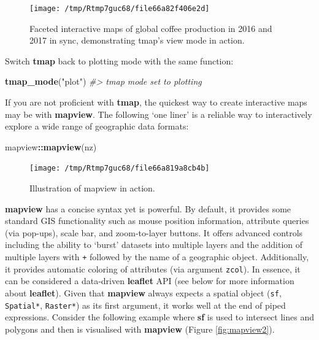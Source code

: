 \documentclass[]{krantz}
\newenvironment{Shaded}{\begin{snugshade}}{\end{snugshade}}
\newcommand{\CommentTok}[1]{\textcolor[rgb]{0.37,0.37,0.37}{\textit{#1}}}
\newcommand{\KeywordTok}[1]{\textcolor[rgb]{0.27,0.27,0.27}{\textbf{#1}}}
\newcommand{\NormalTok}[1]{#1}
\newcommand{\OperatorTok}[1]{\textcolor[rgb]{0.43,0.43,0.43}{\textbf{#1}}}
\newcommand{\StringTok}[1]{\textcolor[rgb]{0.5,0.5,0.5}{#1}}
\begin{document}
\begin{figure}[t]

{\centering \texttt{[image: /tmp/Rtmp7guc68/file66a82f406e2d]} 

}

\caption[Faceted interactive maps of global coffee production.]{Faceted interactive maps of global coffee production in 2016 and 2017 in sync, demonstrating tmap's view mode in action.}\label{fig:sync}
\end{figure}

Switch \textbf{tmap} back to plotting mode with the same function:

\begin{Shaded}
\begin{Highlighting}[]
\KeywordTok{tmap_mode}\NormalTok{(}\StringTok{"plot"}\NormalTok{)}
\CommentTok{#> tmap mode set to plotting}
\end{Highlighting}
\end{Shaded}

If you are not proficient with \textbf{tmap}, the quickest way to create interactive maps may be with \textbf{mapview}.
The following `one liner' is a reliable way to interactively explore a wide range of geographic data formats:

\begin{Shaded}
\begin{Highlighting}[]
\NormalTok{mapview}\OperatorTok{::}\KeywordTok{mapview}\NormalTok{(nz)}
\end{Highlighting}
\end{Shaded}

\begin{figure}[t]

{\centering \texttt{[image: /tmp/Rtmp7guc68/file66a819a8cb4b]} 

}

\caption{Illustration of mapview in action.}\label{fig:mapview}
\end{figure}

\textbf{mapview} has a concise syntax yet is powerful. By default, it provides some standard GIS functionality such as mouse position information, attribute queries (via pop-ups), scale bar, and zoom-to-layer buttons.
It offers advanced controls including the ability to `burst' datasets into multiple layers and the addition of multiple layers with \texttt{+} followed by the name of a geographic object.
Additionally, it provides automatic coloring of attributes (via argument \texttt{zcol}).
In essence, it can be considered a data-driven \textbf{leaflet} API (see below for more information about \textbf{leaflet}).
Given that \textbf{mapview} always expects a spatial object (\texttt{sf}, \texttt{Spatial*}, \texttt{Raster*}) as its first argument, it works well at the end of piped expressions.
Consider the following example where \textbf{sf} is used to intersect lines and polygons and then is visualised with \textbf{mapview} (Figure \ref{fig:mapview2}).
\end{document}
